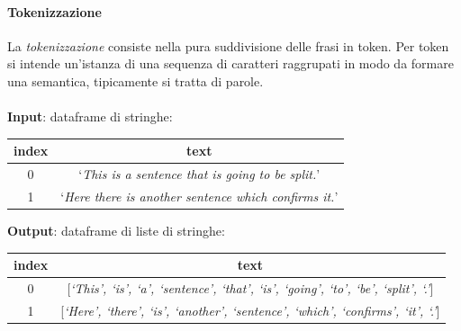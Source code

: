\documentclass[12pt]{report}
\theoremstyle{definition}
\begin{document}
\paragraph{Tokenizzazione}
La \textit{tokenizzazione} consiste nella pura suddivisione delle frasi in token. Per token si intende un'istanza di una sequenza di caratteri raggrupati in modo da formare una semantica, tipicamente si tratta di parole.
\\
\\
\textbf{Input}: dataframe di stringhe:
\begin{center}
    \begin{tabular}{|c|c|}
    \hline
    \textbf{index} & \textbf{text} \\
    \hline
         0 & `\textit{This is a sentence that is going to be split.}'\\
         1 & `\textit{Here there is another sentence which confirms it.}'\\
    \hline
    \end{tabular}
\end{center}
\textbf{Output}: dataframe di liste di stringhe:
\begin{center}
    \begin{tabular}{|c|c|}
    \hline
    \textbf{index} & \textbf{text} \\
    \hline
         0 & [\textit{`This', `is', `a', `sentence', `that', `is', `going', `to', `be', `split', `.'}]\\
         1 & [\textit{`Here', `there', `is', `another', `sentence', `which', `confirms', `it', `.'}]\\
    \hline
    \end{tabular}
\end{center}
\end{document}
